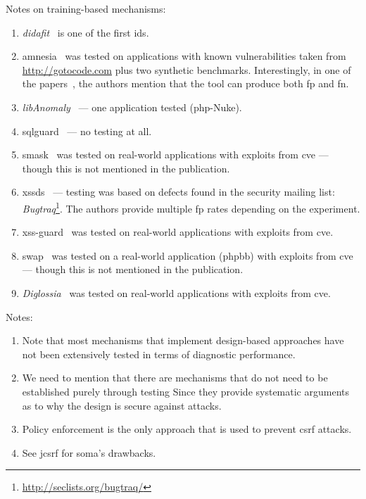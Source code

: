 \documentclass[conference]{IEEEtran}
\begin{document}
Notes on training-based mechanisms:
\begin{enumerate}
\item {\it {\sc didafit}}~\cite{LLW02} is one of
the first {\sc ids}.
\item {\sc amnesia}~\cite{HO05,HO06,HO05b} was tested
on applications with known vulnerabilities taken
from \url{http://gotocode.com} plus two synthetic benchmarks.
Interestingly, in one of the papers~\cite{HO06},
the authors mention that the tool can produce both {\sc fp} and
{\sc fn}.
\item {\it libAnomaly}~\cite{VMV05} --- one application tested ({\sc php}-Nuke).
\item {\sc sqlg}uard~\cite{BWS05} --- no testing at all.
\item {\sc sm}ask~\cite{JB07} was tested on real-world applications
with exploits from {\sc cve} --- though this is not mentioned in the publication.
\item {\sc xssds}~\cite{JEP08} --- testing was based on 
defects found in the security mailing
list: {\it Bugtraq}\footnote{\url{http://seclists.org/bugtraq/}}.
The authors provide multiple {\sc fp} rates depending on the experiment.
\item {\sc xss-guard}~\cite{BV08} was tested on real-world applications
with exploits from {\sc cve}.
\item {\sc swap}~\cite{WPLKK09} was tested on a real-world application ({\sc phpbb})
with exploits from {\sc cve} --- though this is not mentioned in the publication.
\item {\it Diglossia}~\cite{SMS13} was tested on real-world applications
with exploits from {\sc cve}.
\end{enumerate}

Notes:
\begin{enumerate}
\item Note that most mechanisms that implement design-based
approaches have not been extensively tested in terms of
diagnostic performance.
\item We need to mention that there are mechanisms that
do not need to be established purely through testing
Since they provide systematic arguments as to why
the design is secure against attacks.
\item Policy enforcement is the
only approach that is
used to prevent {\sc csrf} attacks.
\item See j{\sc csrf} for {\sc soma}'s drawbacks.
\end{enumerate}
\end{document}
